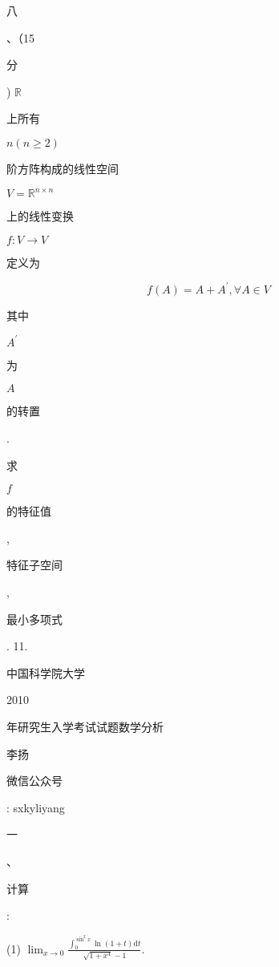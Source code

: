 \documentclass[10pt]{article}
\begin{document}
\begin{CJK}{UTF8}{mj}八\end{CJK}、（15 \begin{CJK}{UTF8}{mj}分\end{CJK}) $\mathbb{R}$ \begin{CJK}{UTF8}{mj}上所有\end{CJK} $n(n \geq 2)$ \begin{CJK}{UTF8}{mj}阶方阵构成的线性空间\end{CJK} $V=\mathbb{R}^{n \times n}$ \begin{CJK}{UTF8}{mj}上的线性变换\end{CJK} $f: V \rightarrow V$ \begin{CJK}{UTF8}{mj}定义为\end{CJK}
$$
f(A)=A+A^{\prime}, \forall A \in V
$$
\begin{CJK}{UTF8}{mj}其中\end{CJK} $A^{\prime}$ \begin{CJK}{UTF8}{mj}为\end{CJK} $A$ \begin{CJK}{UTF8}{mj}的转置\end{CJK}. \begin{CJK}{UTF8}{mj}求\end{CJK} $f$ \begin{CJK}{UTF8}{mj}的特征值\end{CJK}, \begin{CJK}{UTF8}{mj}特征子空间\end{CJK}, \begin{CJK}{UTF8}{mj}最小多项式\end{CJK}. 11. \begin{CJK}{UTF8}{mj}中国科学院大学\end{CJK} 2010 \begin{CJK}{UTF8}{mj}年研究生入学考试试题数学分析\end{CJK}

\begin{CJK}{UTF8}{mj}李扬\end{CJK}

\begin{CJK}{UTF8}{mj}微信公众号\end{CJK}: sxkyliyang

\begin{CJK}{UTF8}{mj}一\end{CJK}、\begin{CJK}{UTF8}{mj}计算\end{CJK}:

(1) $\lim _{x \rightarrow 0} \frac{\int_{0}^{\sin ^{2} x} \ln (1+t) \mathrm{d} t}{\sqrt{1+x^{4}}-1}$.
\end{document}

